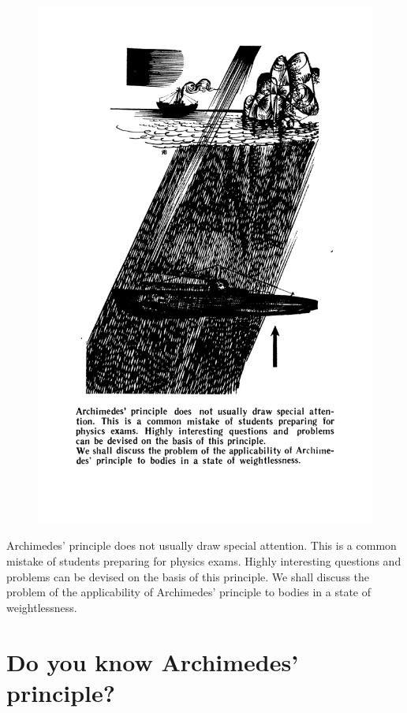 \documentclass[a4paper,sfsidenotes]{tufte-book}
\begin{document}
\begin{figure}
\centering
\includegraphics[width=0.65\linewidth]{sec-g.pdf}
\end{figure}
\begin{fullwidth}
\begin{Large}
Archimedes' principle does not usually draw special attention. This is a common mistake of students preparing for physics exams. Highly interesting questions and problems can be devised on the basis of this principle. We shall discuss the problem of the applicability of Archimedes' principle to bodies in a state of weightlessness.
\end{Large}
\end{fullwidth}


\chapter{Do you know Archimedes' principle?}
\label{ch-16}
\paragraph{}
\end{document}
